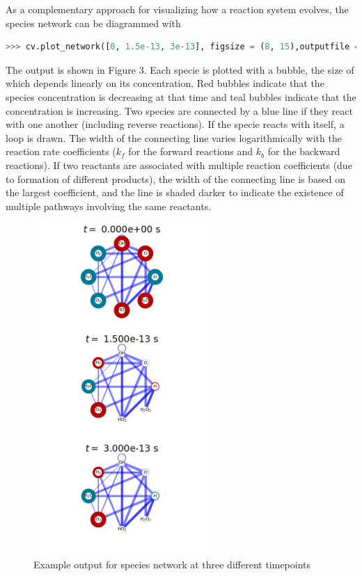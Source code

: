 \documentclass[12pt]{article}
\begin{document}
As a complementary approach for visualizing how a reaction system evolves, the species network can be diagrammed with 
\begin{lstlisting}[language = Python, basicstyle = \ttfamily,columns = fullflexible, showstringspaces = False]
>>> cv.plot_network([0, 1.5e-13, 3e-13], figsize = (8, 15),outputfile = `modeldocfig3.png')

\end{lstlisting}

The output is shown in Figure 3. Each specie is plotted with a bubble, the size of which depends linearly on its concentration. Red bubbles indicate that the species concentration is decreasing at that time and teal bubbles indicate that the concentration is increasing. Two species are connected by a blue line if they react with one another (including reverse reactions). If the specie reacts with itself, a loop is drawn. The width of the connecting line varies logarithmically with the reaction rate coefficients ($k_f$ for the forward reactions and $k_b$ for the backward reactions). If two reactants are associated with multiple reaction coefficients (due to formation of different products), the width of the connecting line is based on the largest coefficient, and the line is shaded darker to indicate the existence of multiple pathways involving the same reactants. 

\begin{figure}[h!]
  \caption{Example output for species network at three different timepoints}
  \centering
  \includegraphics[width=0.6\textwidth]{../examples/modeldocfig3.png}
\end{figure}
\end{document}
